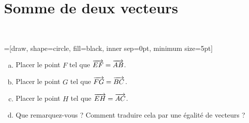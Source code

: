 \documentclass[12pt, aspectratio=43]{beamer}
\begin{document}
\setcounter{section}{1}
\section{Somme de deux vecteurs}

\begin{frame}~

  \begin{center}
=[draw, shape=circle, fill=black, inner sep=0pt, minimum size=5pt]
\end{center}

\begin{enumerate}[(a)]
  \item Placer le point $F$ tel que $\overrightarrow{EF}=\overrightarrow{AB}$.
  \item Placer le point $G$ tel que $\overrightarrow{FG}=\overrightarrow{BC}$.
  \item Placer le point $H$ tel que $\overrightarrow{EH}=\overrightarrow{AC}$.
  \item Que remarquez-vous ? Comment traduire cela par une égalité de vecteurs ?
\end{enumerate}
\end{frame}
\end{document}
